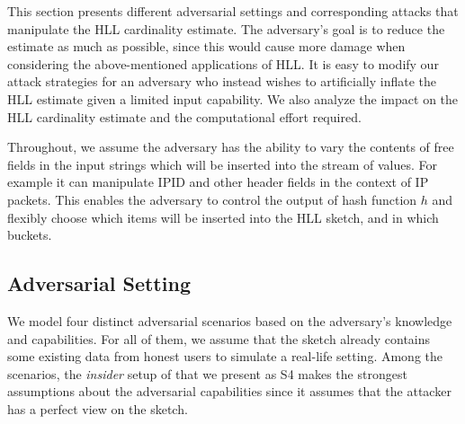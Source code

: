 \documentclass[11pt]{article}
\newcommand{\kenny}[1]{\todo[inline]{\textbf{Kenny:} #1}\xspace}
\begin{document}
This section presents different adversarial settings and corresponding attacks that manipulate the HLL cardinality estimate. The adversary's goal is to reduce the estimate as much as possible, since this would cause more damage when  considering the above-mentioned applications of HLL. It is easy to modify our attack strategies for an adversary who instead wishes to artificially inflate the HLL estimate given a limited input capability. We also analyze the impact on the HLL cardinality estimate and the computational effort required.

Throughout, we assume the adversary has the ability to vary the contents of free fields in the input strings which will be inserted into the stream of values. For example it can manipulate IPID and other header fields in the context of IP packets. This enables the adversary to control the output of hash function $h$ and flexibly choose which items will be inserted into the HLL sketch, and in which buckets.

\subsection{Adversarial Setting}
We model four distinct adversarial scenarios based on the adversary's knowledge and capabilities. For all of them, we assume that the sketch already contains some existing data from honest users to simulate a real-life setting. Among the scenarios, the \textit{insider} setup of \cite{cardestprivacy} that we present as S4 makes the strongest assumptions about the adversarial capabilities since it assumes that the attacker has a perfect view on the sketch. %
\end{document}

